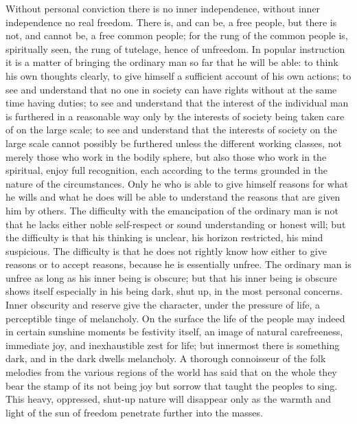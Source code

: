 \documentclass[12pt]{book}
\newcommand{\opage}[1]{\marginnote{\footnotesize\textit{[#1]}}}
\begin{document}
Without personal conviction there is no inner independence, without inner
independence no real freedom. There is, and can be, a free people, but
there is not, and cannot be, a free common people; for the rung of the
common people is, spiritually seen, the rung of tutelage, hence of
unfreedom. In popular instruction it is a matter of bringing the ordinary
man so far that he will be able: to think his own thoughts clearly, to
give himself a sufficient account of his own actions; to see and
understand that no one in society can have rights without at the same time
having duties; to see and understand that the interest of the individual
man is furthered in a reasonable way only by the interests of society
being taken care of on the large scale; to see and
\opage{288}\setcounter{footnote}{0}%
understand that the interests of society on the large scale cannot
possibly be furthered unless the different working classes, not merely
those who work in the bodily sphere, but also those who work in the
spiritual, enjoy full recognition, each according to the terms grounded in
the nature of the circumstances. Only he who is able to give himself
reasons for what he wills and what he does will be able to understand the
reasons that are given him by others. The difficulty with the
emancipation of the ordinary man is not that he lacks either noble
self-respect or sound understanding or honest will; but the difficulty is
that his thinking is unclear, his horizon restricted, his mind suspicious.
The difficulty is that he does not rightly know how either to give reasons
or to accept reasons, because he is essentially unfree. The ordinary man
is unfree as long as his inner being is obscure; but that his inner being
is obscure shows itself especially in his being dark, shut up, in the most
personal concerns. Inner obscurity and reserve give the character, under
the pressure of life, a perceptible tinge of melancholy. On the surface the
life of the people may indeed in certain sunshine moments be festivity
itself, an image of natural carefreeness, immediate joy, and inexhaustible
zest for life; but innermost there is something dark, and in the dark
dwells melancholy. A thorough connoisseur of the folk melodies from the
various regions of the world has said that on the whole they bear the
stamp of its not being joy but sorrow that taught the peoples to sing.
This heavy, oppressed, shut-up nature will disappear only as the warmth
and light of the sun of freedom penetrate further into the masses.
\end{document}
